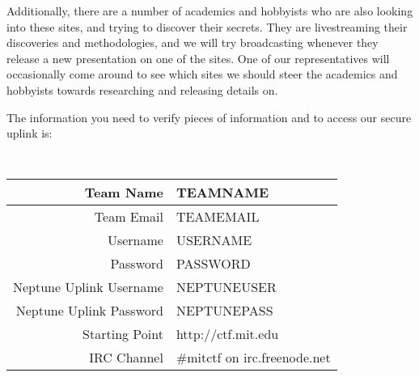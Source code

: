 \documentclass[10pt]{article}
\begin{document}
Additionally, there are a number of academics and hobbyists who are also looking
into these sites, and trying to discover their secrets. They are livestreaming
their discoveries and methodologies, and we will try broadcasting whenever they
release a new presentation on one of the sites. One of our representatives will
occasionally come around to see which sites we should steer the academics and
hobbyists towards researching and releasing details on.

The information you need to verify pieces of information and to access our
secure uplink is:
\vspace{0.2in}
{\tt\large
\begin{center}
\begin{tabular}{| r | l |}
\hline
Team Name & TEAMNAME\\\hline
Team Email & TEAMEMAIL\\\hline
Username & USERNAME\\\hline
Password & PASSWORD\\\hline
Neptune Uplink Username & NEPTUNEUSER\\\hline
Neptune Uplink Password & NEPTUNEPASS\\\hline
Starting Point & http://ctf.mit.edu\\\hline
IRC Channel & \#mitctf on irc.freenode.net\\\hline
\end{tabular}
\end{center}
}
\end{document}
